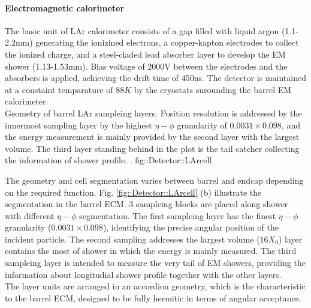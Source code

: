 \paragraph{Electromagnetic calorimeter}
%
The basic unit of LAr calorimeter consists of a gap filled with liquid argon (1.1-2.2mm) generating the ionizined electrons, a copper-kapton electrodes to collect the ionized charge, 
and a steel-claded lead absorber layer to develop the EM shower (1.13-1.53mm). Bias voltage of 2000V between the electrodes and the absorbers is applied, achieving the drift time of 450ns. The detector is maintained at a constaint temparature of $88K$ by the cryostats surounding the barrel EM calorimeter. \\

{Geometry of barrel LAr sampleing layers. 
Position resolution is addressed by the innermost sampling layer by the highest $\eta-\phi$ granularity of $0.0031\times0.098$,
and the energy measurement is mainly provided by the second layer with the largest volume.
The third layer standing behind in the plot is the tail catcher collecting the information of shower profile.
    \cite{ATLAS_TDR}.}
{fig::Detector::LArcell}

The geometry and cell segmentation varies between barrel and endcap depending on the required function.
Fig. \ref{fig::Detector::LArcell} (b) illustrate the segmentation in the barrel ECM. 3 sampleing blocks are placed along shower with different $\eta-\phi$ segmentation.
The first sampleing layer has the finest $\eta-\phi$ granularity ($0.0031\times0.098$), identifying the precise angular position of the incident particle. The second sampling addresses the largest volume ($16X_0$) layer contains the most of shower in which the energy is mainly measured. The third sampleing layer is intended to measure the very tail of EM showers, providing the information about longitudial shower profile together with the other layers. \\
The layer units are arranged in an accordion geometry, which is the characteristic to the barrel ECM, designed to be fully hermitic in terms of angular acceptance. \\


